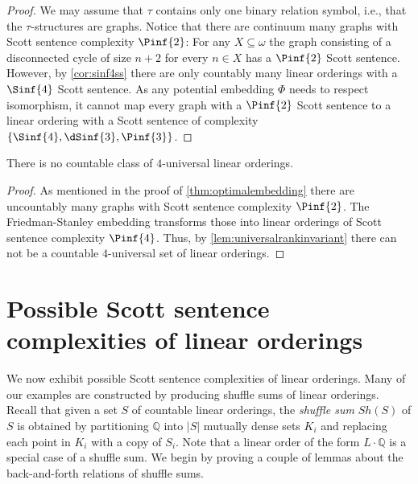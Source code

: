 \documentclass{amsart}
\newcommand{\Q}{\mathbb{Q}}
\begin{document}
\begin{proof}
   We may assume that $\tau$ contains only one binary relation symbol, i.e.,
   that the $\tau$-structures are graphs. Notice that there are continuum many
   graphs with Scott sentence complexity $\Pinf{2}$: For any $X\subseteq \omega$
   the graph consisting of a disconnected cycle of size $n+2$ for every $n\in X$ has a
   $\Pinf{2}$ Scott sentence. However, by \cref{cor:sinf4ss} there
   are only countably many linear orderings with a $\Sinf{4}$ Scott sentence. As any potential
   embedding $\Phi$ needs to respect isomorphism, it cannot map every graph
   with a $\Pinf{2}$ Scott sentence to a linear ordering with a Scott sentence
   of complexity $\{\Sinf{4}, \dSinf{3},\Pinf{3}\}$.
\end{proof}
\begin{proposition}
  There is no countable class of $4$-universal linear orderings.
\end{proposition}
\begin{proof}
  As mentioned in the proof of \cref{thm:optimalembedding} there are uncountably
  many graphs with Scott sentence complexity $\Pinf{2}$. The Friedman-Stanley
  embedding transforms those into linear orderings of Scott sentence complexity
  $\Pinf{4}$. Thus, by \cref{lem:universalrankinvariant} there can not be a countable $4$-universal set of
  linear orderings.
\end{proof}
 \section{Possible Scott sentence complexities of linear orderings}\label{sec:ssc}
We now exhibit possible Scott sentence complexities of linear orderings. Many of
our examples are constructed by producing shuffle sums of linear orderings.
Recall that given a set $S$ of countable linear orderings, the \emph{shuffle
sum} $Sh(S)$ of $S$ is obtained by partitioning $\Q$ into $|S|$ mutually dense
sets $K_i$ and replacing each point in $K_i$ with a copy of $S_i$.
Note that a linear order of the form $L\cdot\Q$ is a special case of a shuffle
sum. We begin by proving a couple of lemmas about the back-and-forth relations
of shuffle sums.
\end{document}
